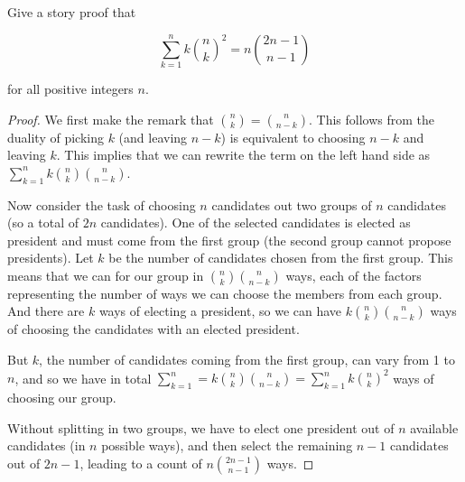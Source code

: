 \begin{exercise}{17}
    Give a story proof that

    $$\sum_{k=1}^n k {n \choose k}^2 = n { 2n-1 \choose n-1}$$

    for all positive integers $n$.
\end{exercise}

\begin{proof}
    We first make the remark that ${n \choose k} = {n \choose n-k}$. This follows from the duality of picking $k$ (and leaving $n-k$) is equivalent to choosing $n-k$ and leaving $k$. This implies that we can rewrite the term on the left hand side as $\sum_{k=1}^n k {n \choose k} {n \choose n-k}$.


    Now consider the task of choosing $n$ candidates out two groups of $n$ candidates (so a total of $2n$ candidates). One of the selected candidates is elected as president and must come from the first group (the second group cannot propose presidents). Let $k$ be the number of candidates chosen from the first group. This means that we can for our group in ${n \choose k}{n \choose n-k}$ ways, each of the factors representing the number of ways we can choose the members from each group. And there are $k$ ways of electing a president, so we can have $k{n \choose k}{n \choose n-k}$ ways of choosing the candidates with an elected president.

    But $k$, the number of candidates coming from the first group, can vary from 1 to $n$, and so we have in total $\sum_{k=1}^n=k{n \choose k}{n \choose n-k}=\sum_{k=1}^n k {n \choose k}^2$ ways of choosing our group.

    \vspace{1em}

    Without splitting in two groups, we have to elect one president out of $n$ available candidates (in $n$ possible ways), and then select the remaining $n-1$ candidates out of $2n-1$, leading to a count of $n {2n-1 \choose n-1}$ ways.


\end{proof}

